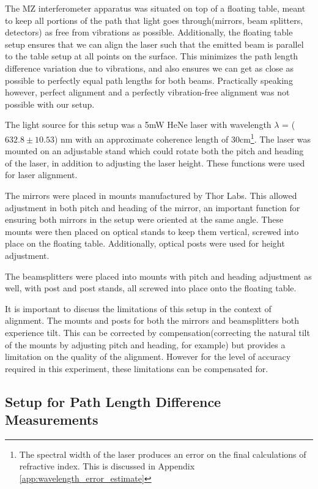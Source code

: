 \documentclass{article}
\newcommand{\sig}[3]{($\num{#1} \pm #2$) \si{#3}}
\begin{document}
The MZ interferometer apparatus was situated on top of a floating table, meant to keep all portions of the path that light goes through(mirrors, beam splitters, detectors) as free from vibrations as possible. Additionally, the floating table setup ensures that we can align the laser such that the emitted beam is parallel to the table setup at all points on the surface. This minimizes the path length difference variation due to vibrations, and also ensures we can get as close as possible to perfectly equal path lengths for both beams. Practically speaking however, perfect alignment and a perfectly vibration-free alignment was not possible with our setup.
\par
The light source for this setup was a 5mW HeNe laser with wavelength $\lambda$ = \sig{632.8}{10.53}{\nano \m} with an approximate coherence length of 30cm\cite{thorlabs.com_tutorials}\footnote{The spectral width of the laser produces an error on the final calculations of refractive index. This is discussed in Appendix \ref{app:wavelength_error_estimate}}. The laser was mounted on an adjustable stand which could rotate both the pitch and heading of the laser, in addition to adjusting the laser height. These functions were used for laser alignment.
\par
The mirrors were placed in mounts manufactured by Thor Labs. This allowed adjustment in both pitch and heading of the mirror, an important function for ensuring both mirrors in the setup were oriented at the same angle. These mounts were then placed on optical stands to keep them vertical, screwed into place on the floating table.
Additionally, optical posts were used for height adjustment.
\par
The beamsplitters were placed into mounts with pitch and heading adjustment as well, with post and post stands, all screwed into place onto the floating table.
\par
It is important to discuss the limitations of this setup in the context of alignment. The mounts and posts for both the mirrors and beamsplitters both experience tilt. This can be corrected by compensation(correcting the natural tilt of the mounts by adjusting pitch and heading, for example) but provides a limitation on the quality of the
alignment. However for the level of accuracy required in this experiment, these limitations can be compensated for.

\subsection{ Setup for Path Length Difference Measurements }\label{subsec:setup_for_path_length_difference_measurements}
\end{document}
